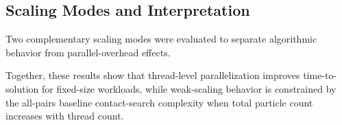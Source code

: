 \subsection{Scaling Modes and Interpretation}
Two complementary scaling modes were evaluated to separate algorithmic behavior from parallel-overhead effects.





Together, these results show that thread-level parallelization improves time-to-solution for fixed-size workloads, while weak-scaling behavior is constrained by the all-pairs baseline contact-search complexity when total particle count increases with thread count.
